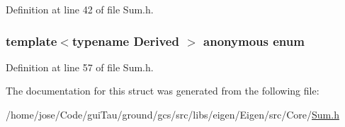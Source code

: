 Definition at line 42 of file Sum.\-h.

\hypertarget{structei__sum__traits_a9e1b6d24ec9c79c164665b7c380e5c75}{\subsubsection[{anonymous enum}]{\setlength{\rightskip}{0pt plus 5cm}template$<$typename Derived $>$ anonymous enum}}\label{structei__sum__traits_a9e1b6d24ec9c79c164665b7c380e5c75}


Definition at line 57 of file Sum.\-h.



The documentation for this struct was generated from the following file\-:\begin{DoxyCompactItemize}
\item 
/home/jose/\-Code/gui\-Tau/ground/gcs/src/libs/eigen/\-Eigen/src/\-Core/\hyperlink{_sum_8h}{Sum.\-h}\end{DoxyCompactItemize}

